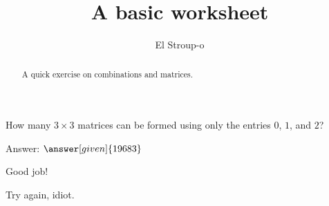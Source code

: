 \documentclass{ximera}
\title{A basic worksheet}
\author{El Stroup-o}
\begin{document}
\begin{abstract}
A quick exercise on combinations and matrices.
\end{abstract}
\maketitle

\begin{exercise}
How many $3 \times 3$ matrices can be formed using only the entries $0$, $1$, and $2$?

\vspace{1ex}

Answer: $\answer[given]{19683}$

\begin{feedback}[correct]
Good job!
\end{feedback}

\begin{feedback}[attempt]
Try again, idiot.
\end{feedback}

\end{exercise}
\end{document}
